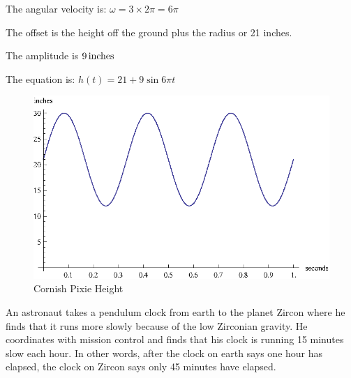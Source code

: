 \documentclass[fleqn,addpoints]{exam}
\begin{document}
\begin{questions}
      \begin{solution}
        \begin{itemize*}
          \item The angular velocity is: $\omega = 3 \times 2 \pi = 6 \pi$
          \item The offset is the height off the ground plus the radius or 21 inches.
          \item The amplitude is $\unit[9]{inches}$
        \end{itemize*}

        The equation is: $h(t) = 21 + 9 \sin 6 \pi t$ 

        \begin{figure}[H]
          \centering
          \includegraphics[scale=1.0]{graph5.eps}
          \caption{Cornish Pixie Height}
        \end{figure}

      \end{solution}

    \ifprintanswers
      \pagebreak
    \fi


    \bonusquestion
      An astronaut takes a pendulum clock from earth to the planet Zircon where he finds that it runs more slowly
      because of the low Zirconian gravity.      He coordinates with mission control and finds that his clock is running
      15 minutes slow each hour.  In other words, after the clock on earth says one hour has elapsed, the clock on
      Zircon says only 45 minutes have elapsed.


\end{questions}
\end{document}

